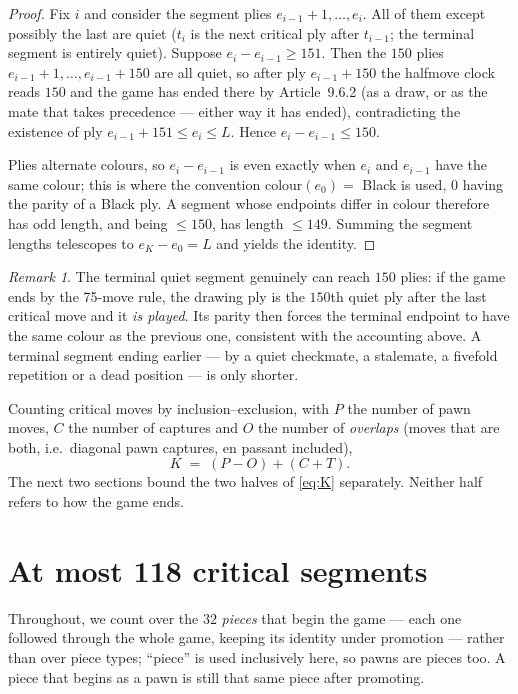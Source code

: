\documentclass[11pt]{article}
\theoremstyle{definition}
\theoremstyle{remark}
\newtheorem{remark}[theorem]{Remark}
\theoremstyle{plain}
\begin{document}
\begin{proof}
Fix $i$ and consider the segment plies $e_{i-1}+1, \dots, e_i$. All of them
except possibly the last are quiet ($t_{i}$ is the next critical ply after
$t_{i-1}$; the terminal segment is entirely quiet). Suppose
$e_i - e_{i-1} \ge 151$. Then the $150$ plies
$e_{i-1}+1, \dots, e_{i-1}+150$ are all quiet, so after ply $e_{i-1}+150$
the halfmove clock reads $150$ and the game has ended there by
Article~9.6.2 (as a draw, or as the mate that takes precedence --- either
way it has ended), contradicting the existence of ply
$e_{i-1}+151 \le e_i \le L$. Hence $e_i - e_{i-1}\le 150$.

Plies alternate colours, so $e_i - e_{i-1}$ is even exactly when $e_i$ and
$e_{i-1}$ have the same colour; this is where the convention
$\text{colour}(e_0) = $ Black is used, $0$ having the parity of a Black
ply. A segment whose endpoints differ in colour therefore has odd length,
and being $\le 150$, has length $\le 149$. Summing the segment lengths
telescopes to $e_K - e_0 = L$ and yields the identity.
\end{proof}

\begin{remark}
The terminal quiet segment genuinely can reach $150$ plies: if the game
ends by the 75-move rule, the drawing ply is the $150$th quiet ply after
the last critical move and it \emph{is played}. Its parity then forces the
terminal endpoint to have the same colour as the previous one, consistent
with the accounting above. A terminal segment ending earlier --- by a quiet
checkmate, a stalemate, a fivefold repetition or a dead position --- is
only shorter.
\end{remark}

Counting critical moves by inclusion--exclusion, with $P$ the number of pawn
moves, $C$ the number of captures and $O$ the number of \emph{overlaps}
(moves that are both, i.e.\ diagonal pawn captures, en passant included),
\begin{equation}\label{eq:K}
  K \;=\; (P - O) + (C + T).
\end{equation}
The next two sections bound the two halves of \eqref{eq:K} separately.
Neither half refers to how the game ends.

\section{At most 118 critical segments}\label{sec:k118}

Throughout, we count over the $32$ \emph{pieces} that begin the game ---
each one followed through the whole game, keeping its identity under
promotion --- rather than over piece types; ``piece'' is used inclusively
here, so pawns are pieces too. A piece that begins as a pawn is still that
same piece after promoting.
\end{document}
